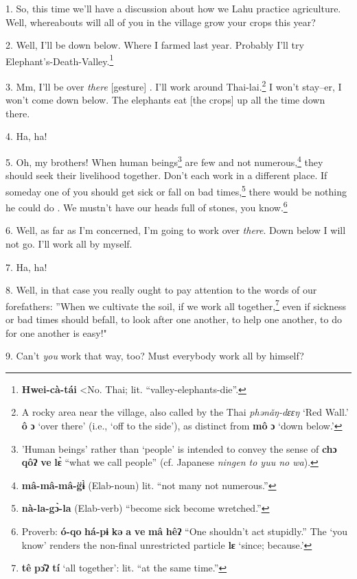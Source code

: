 \setcounter{footnote}{0}

1. So, this time we'll have a discussion about how we Lahu practice agriculture.
Well, whereabouts will all of you in the village grow your crops this year?

2. Well, I'll be down below. Where I farmed last year. Probably I'll try Elephant's-Death-Valley.\footnote{\textbf{Hwei-cà-tái} <No. Thai; lit. ``valley-elephants-die''.}

3. Mm, I'll be over \textit{there} [gesture] . I'll work around Thai-lai.\footnote{A rocky area near the village, also called by the Thai \textit{phənǎŋ-dɛɛŋ} `Red Wall.' \textbf{ô} \textbf{ɔ} `over there' (i.e., `off to the side'), as distinct from \textbf{mô} \textbf{ɔ} `down below.'}
I won't stay--er, I won't come down below. The elephants eat [the crops] up all
the time down there.

4. Ha, ha!

5. Oh, my brothers! When human beings\footnote{'Human beings' rather than `people' is intended to convey the sense of \textbf{chɔ} \textbf{qôʔ} \textbf{ve} \textbf{lɛ̀} ``what we call people'' (cf. Japanese \textit{ningen to yuu no wa}).} are few and not numerous,\footnote{\textbf{mâ-mâ-mâ-g̈ɨ̀} (Elab-noun) lit. ``not many not numerous.''} they should
seek their livelihood together. Don't each work in a different place. If someday
one of you should get sick or fall on bad times,\footnote{\textbf{nà-la-gɔ̀-la} (Elab-verb) ``become sick become wretched.''} there would be nothing he
could do . We mustn't have our heads full of stones, you know.\footnote{Proverb: \textbf{ó-qo} \textbf{há-pɨ} \textbf{kə} \textbf{a} \textbf{ve} \textbf{mâ} \textbf{hêʔ} ``One shouldn't act stupidly.'' The `you know' renders the non-final unrestricted particle \textbf{lɛ} `since; because.'}

6. Well, as far as I'm concerned, I'm going to work over \textit{there}. Down below
I will not go. I'll work all by myself.

7. Ha, ha!

8. Well, in that case you really ought to pay attention to the words of our forefathers:
''When we cultivate the soil, if we work all together,\footnote{\textbf{tê} \textbf{pɔ̂ʔ} \textbf{tí} `all together': lit. ``at the same time.''} even if sickness
or bad times should befall, to look after one another, to help one another, to
do for one another is easy!"

9. Can't \textit{you} work that way, too? Must everybody work all by himself?

